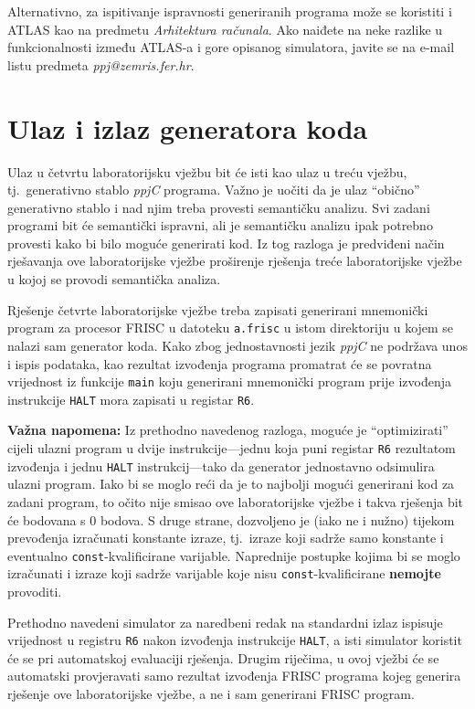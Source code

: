 \documentclass[times, 12pt, utf8]{book}
\begin{document}
Alternativno, za ispitivanje ispravnosti generiranih programa može se koristiti i ATLAS kao na predmetu \emph{Arhitektura računala}.
Ako naiđete na neke razlike u funkcionalnosti između ATLAS-a i gore opisanog simulatora, javite se na e-mail listu predmeta \emph{ppj@zemris.fer.hr}.

\section{Ulaz i izlaz generatora koda}
Ulaz u četvrtu laboratorijsku vježbu bit će isti kao ulaz u treću vježbu, tj.~generativno stablo \emph{ppjC} programa.
Važno je uočiti da je ulaz ``obično'' generativno stablo i nad njim treba provesti semantičku analizu.
Svi zadani programi bit će semantički ispravni, ali je semantičku analizu ipak potrebno provesti kako bi bilo moguće generirati kod.
Iz tog razloga je predviđeni način rješavanja ove laboratorijske vježbe proširenje rješenja treće laboratorijske vježbe u kojoj se provodi semantička analiza.

Rješenje četvrte laboratorijske vježbe treba zapisati generirani mnemonički program za procesor FRISC u datoteku \verb|a.frisc| u istom direktoriju u kojem se nalazi sam generator koda.
Kako zbog jednostavnosti jezik \emph{ppjC} ne podržava unos i ispis podataka, kao rezultat izvođenja programa promatrat će se povratna vrijednost iz funkcije \verb|main| koju generirani mnemonički program prije izvođenja instrukcije \verb|HALT| mora zapisati u registar \verb|R6|.

\textbf{Važna napomena:} Iz prethodno navedenog razloga, moguće je ``optimizirati'' cijeli ulazni program u dvije instrukcije---jednu koja puni registar \verb|R6| rezultatom izvođenja i jednu \verb|HALT| instrukcij---tako da generator jednostavno odsimulira ulazni program.
Iako bi se moglo reći da je to najbolji mogući generirani kod za zadani program, to očito nije smisao ove laboratorijske vježbe i takva rješenja bit će bodovana s 0 bodova.
S druge strane, dozvoljeno je (iako ne i nužno) tijekom prevođenja izračunati konstante izraze, tj.~izraze koji sadrže samo konstante i eventualno \verb|const|-kvalificirane varijable.
Naprednije postupke kojima bi se moglo izračunati i izraze koji sadrže varijable koje nisu \verb|const|-kvalificirane \textbf{nemojte} provoditi.

Prethodno navedeni simulator za naredbeni redak na standardni izlaz ispisuje vrijednost u registru \verb|R6| nakon izvođenja instrukcije \verb|HALT|, a isti simulator koristit će se pri automatskoj evaluaciji rješenja.
Drugim riječima, u ovoj vježbi će se automatski provjeravati samo rezultat izvođenja FRISC programa kojeg generira rješenje ove laboratorijske vježbe, a ne i sam generirani FRISC program.
\end{document}
